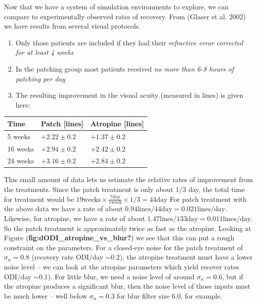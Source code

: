 \documentclass[
  letterpaper,
]{book}
\providecommand{\tightlist}{%
  \setlength{\itemsep}{0pt}\setlength{\parskip}{0pt}}\usepackage{longtable,booktabs,array}
\begin{document}
Now that we have a system of simulation environments to explore, we can
compare to experimentally observed rates of recovery. From (Glaser et
al. 2002) we have results from several visual protocols.

\begin{enumerate}
\def\labelenumi{\arabic{enumi}.}
\tightlist
\item
  Only those patients are included if they had their \emph{refractive
  error corrected for at least 4 weeks}
\item
  In the patching group most patients received \emph{no more than 6-8
  hours of patching per day}
\item
  The resulting improvement in the visual acuity (measured in lines) is
  given here:
\end{enumerate}

\begin{longtable}[]{@{}lll@{}}
\toprule()
Time & Patch {[}lines{]} & Atropine {[}lines{]} \\
\midrule()
\endhead
5 weeks & \(+2.22 \pm 0.2\) & \(+1.37 \pm 0.2\) \\
16 weeks & \(+2.94 \pm 0.2\) & \(+2.42 \pm 0.2\) \\
24 weeks & \(+3.16 \pm 0.2\) & \(+2.84 \pm 0.2\) \\
\bottomrule()
\end{longtable}

This small amount of data lets us estimate the relative rates of
improvement from the treatments. Since the patch treatment is only about
1/3 day, the total time for treatment would be
\(19 \text{weeks}\times \frac{7 \text{day}}{1 \text{week}}\times 1/3=44 \text{day}\)
For patch treatment with the above data we have a rate of about
\(0.94 \text{lines} / 44 \text{day}=0.021 \text{lines}/\text{day}\).
Likewise, for atropine, we have a rate of about
\(1.47\text{lines} / 133 \text{day}=0.011 \text{lines}/\text{day}\). So
the patch treatment is approximately twice as fast as the atropine.
Looking at Figure (\textbf{fig:dODI\_atropine\_vs\_blur?}) we see that
this can put a rough constraint on the parameters. For a closed-eye
noise for the patch treatment of \(\sigma_n=0.8\) (recovery rate ODI/day
\(\sim 0.2\)), the atropine treatment must have a lower noise level --
we can look at the atropine parameters which yield recover rates ODI/day
\(\sim 0.1\)). For little blur, we need a noise level of around
\(\sigma_n=0.6\), but if the atropine produces a significant blur, then
the noise level of those inputs must be much lower -- well below
\(\sigma_n=0.3\) for blur filter size 6.0, for example.
\end{document}
